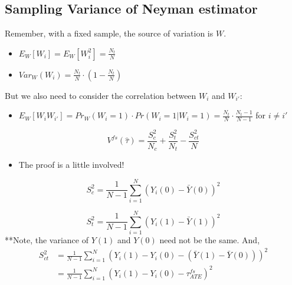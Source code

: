 \documentclass[
  letterpaper,
  DIV=11,
  numbers=noendperiod]{scrreprt}
\providecommand{\tightlist}{%
  \setlength{\itemsep}{0pt}\setlength{\parskip}{0pt}}\usepackage{longtable,booktabs,array}
\theoremstyle{definition}
\theoremstyle{remark}
\begin{document}
\hypertarget{sampling-variance-of-neyman-estimator}{%
\subsection{Sampling Variance of Neyman
estimator}\label{sampling-variance-of-neyman-estimator}}

Remember, with a fixed sample, the source of variation is \(W\).

\begin{itemize}
\tightlist
\item
  \(E_W[W_i]=E_W[W_i^2] = \frac{N_t}{N}\)
\item
  \(Var_W(W_i) = \frac{N_t}{N}\cdot(1-\frac{N_t}{N})\)
\end{itemize}

But we also need to consider the correlation between \(W_i\) and
\(W_{i'}\):

\begin{itemize}
\tightlist
\item
  \(E_W[W_iW_{i'}]=Pr_W(W_i=1)\cdot Pr(W_i=1|W_i=1) = \frac{N_t}{N}\cdot\frac{N_t-1}{N-1}\)
  for \(i\neq i'\)
\end{itemize}

\begin{tcolorbox}[enhanced jigsaw, breakable, colframe=quarto-callout-tip-color-frame, toptitle=1mm, toprule=.15mm, opacitybacktitle=0.6, opacityback=0, rightrule=.15mm, titlerule=0mm, colback=white, bottomtitle=1mm, title={Finite sampling variance of \(\hat{\tau}\)}, arc=.35mm, coltitle=black, colbacktitle=quarto-callout-tip-color!10!white, leftrule=.75mm, bottomrule=.15mm, left=2mm]

\[
                V^{fs}(\hat{\tau}) = \frac{S^2_c}{N_c}+\frac{S^2_t}{N_t}-\frac{S^2_{ct}}{N}
\]

\end{tcolorbox}

\begin{itemize}
\tightlist
\item
  The proof is a little involved!
\end{itemize}

\[
        S^2_c = \frac{1}{N-1}\sum_{i=1}^N (Y_i(0)-\bar{Y}(0))^2
\]

\[
    S^2_t = \frac{1}{N-1}\sum_{i=1}^N (Y_i(1)-\bar{Y}(1))^2
\] **Note, the variance of \(Y(1)\) and \(Y(0)\) need not be the same.
And, \[
        \begin{align*}
        S^2_{ct} &= \frac{1}{N-1}\sum_{i=1}^N (Y_i(1)-Y_i(0)-(\bar{Y}(1)-\bar{Y}(0)))^2 \\
        &=\frac{1}{N-1}\sum_{i=1}^N (Y_i(1)-Y_i(0)-\tau^{fs}_{ATE})^2
        \end{align*}
\]
\end{document}
